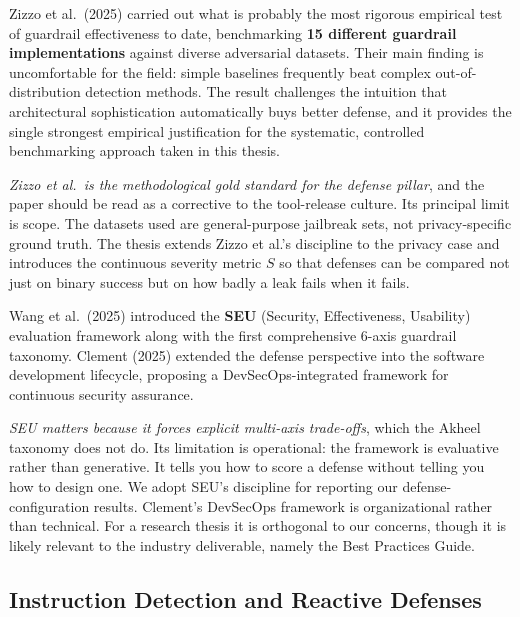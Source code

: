 \documentclass[12pt, a4paper]{report}
\begin{document}
Zizzo et al.\ (2025) carried out what is probably the most rigorous empirical test of guardrail effectiveness to date, benchmarking \textbf{15 different guardrail implementations} against diverse adversarial datasets. Their main finding is uncomfortable for the field: simple baselines frequently beat complex out-of-distribution detection methods. The result challenges the intuition that architectural sophistication automatically buys better defense, and it provides the single strongest empirical justification for the systematic, controlled benchmarking approach taken in this thesis.

\begin{critbox}
\textit{Zizzo et al.\ is the methodological gold standard for the defense pillar}, and the paper should be read as a corrective to the tool-release culture. Its principal limit is scope. The datasets used are general-purpose jailbreak sets, not privacy-specific ground truth. The thesis extends Zizzo et al.'s discipline to the privacy case and introduces the continuous severity metric $S$ so that defenses can be compared not just on binary success but on how badly a leak fails when it fails.
\end{critbox}

Wang et al.\ (2025) introduced the \textbf{SEU} (Security, Effectiveness, Usability) evaluation framework along with the first comprehensive 6-axis guardrail taxonomy. Clement (2025) extended the defense perspective into the software development lifecycle, proposing a DevSecOps-integrated framework for continuous security assurance.

\begin{critbox}
\textit{SEU matters because it forces explicit multi-axis trade-offs}, which the Akheel taxonomy does not do. Its limitation is operational: the framework is evaluative rather than generative. It tells you how to score a defense without telling you how to design one. We adopt SEU's discipline for reporting our defense-configuration results. Clement's DevSecOps framework is organizational rather than technical. For a research thesis it is orthogonal to our concerns, though it is likely relevant to the industry deliverable, namely the Best Practices Guide.
\end{critbox}

\subsection{Instruction Detection and Reactive Defenses}
\end{document}
